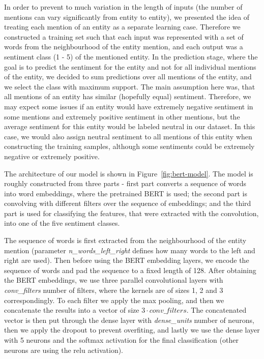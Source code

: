 \documentclass[11pt,a4paper]{article}
\begin{document}
In order to prevent to much variation in the length of inputs (the number of mentions can vary significantly from entity to entity), we presented the idea of treating each mention of an entity as a separate learning case.
Therefore we constructed a training set such that each input was represented with a set of words from the neighbourhood of the entity mention, and each output was a sentiment class (1 - 5) of the mentioned entity.
In the prediction stage, where the goal is to predict the sentiment for the entity and not for all individual mentions of the entity, we decided to sum predictions over all mentions of the entity, and we select the class with maximum support.
The main assumption here was, that all mentions of an entity has similar (hopefully equal) sentiment.
Therefore, we may expect some issues if an entity would have extremely negative sentiment in some mentions and extremely positive sentiment in other mentions, but the average sentiment for this entity would be labeled neutral in our dataset.
In this case, we would also assign neutral sentiment to all mentions of this entity when constructing the training samples, although some sentiments could be extremely negative or extremely positive.

The architecture of our model is shown in Figure~\ref{fig:bert-model}.
The model is roughly constructed from three parts - first part converts a sequence of words into word embeddings, where the pretrained BERT is used; the second part is convolving with different filters over the sequence of embeddings; and the third part is used for classifying the features, that were extracted with the convolution, into one of the five sentiment classes.

The sequence of words is first extracted from the neighbourhood of the entity mention (parameter \textit{n\_words\_left\_right} defines how many words to the left and right are used).
Then before using the BERT embedding layers, we encode the sequence of words and pad the sequence to a fixed length of 128.
After obtaining the BERT embeddings, we use three parallel convolutional layers with \textit{conv\_filters} number of filters, where the kernels are of sizes 1, 2 and 3 correspondingly.
To each filter we apply the max pooling, and then we concatenate the results into a vector of size $3 \cdot \textit{conv\_filters}$.
The concatenated vector is then put through the dense layer with \textit{dense\_units} number of neurons, then we apply the dropout to prevent overfiting, and lastly we use the dense layer with 5 neurons and the softmax activation for the final classification (other neurons are using the relu activation).
\end{document}
